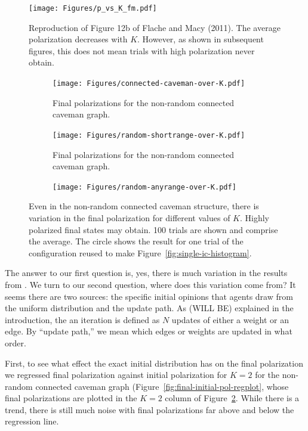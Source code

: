 \documentclass[11pt,letterpaper]{article}
\begin{document}
\begin{figure}
  \centering
    \texttt{[image: Figures/p\_vs\_K\_fm.pdf]}
  \caption{Reproduction of Figure 12b of Flache and Macy (2011). The average
    polarization decreases with $K$. However, as shown in subsequent figures,
    this does not mean trials with high polarization never obtain.
  }
  \label{fig:p_vs_K_fm}
\end{figure}


\begin{figure}[h!]
  \centering
    \begin{subfigure}[t]{\textwidth}
      \centering
      \texttt{[image: Figures/connected-caveman-over-K.pdf]}
      \caption{Final polarizations for the non-random connected caveman graph.}
      \label{fig:connected-caveman-trials}
    \end{subfigure}
    \begin{subfigure}[t]{\textwidth}
      \centering
      \texttt{[image: Figures/random-shortrange-over-K.pdf]}
      \caption{Final polarizations for the non-random connected caveman graph.}
      \label{fig:random-shortrange-trials}
    \end{subfigure}
    \begin{subfigure}[t]{\textwidth}
      \centering
      \texttt{[image: Figures/random-anyrange-over-K.pdf]}
      \caption{}
      \label{fig:random-anyrange-trials}
    \end{subfigure}
  \caption{Even in the non-random connected caveman structure, there is 
    variation in the final polarization for different values of $K$. Highly
    polarized final states may obtain. 100 trials are shown and comprise the
    average. The circle shows the result for one trial of the configuration
    reused to make Figure~\ref{fig:single-ic-histogram}.
  }
  \label{fig:single-experiments-over-k}
\end{figure}

The answer to our first question is, yes, there is much variation in the 
results from . We turn to our second question, where does
this variation come from? It seems there are two sources: the specific
initial opinions that agents draw from the uniform distribution and the
update path. As (WILL BE) explained in the introduction, the 
an iteration is defined as $N$ updates of either a weight or an edge. 
By ``update path,'' we mean which edges or weights are updated in what order. 

First, to see what effect the exact initial distribution has on the final 
polarization we regressed final polarization against initial polarization for
$K=2$ for the non-random connected caveman graph 
(Figure~\ref{fig:final-initial-pol-regplot}, whose final polarizations are 
plotted in the $K=2$ column of Figure~\ref{fig:connected-caveman-trials}.
While there is a trend, there is still much noise with final polarizations
far above and below the regression line. 
\end{document}
